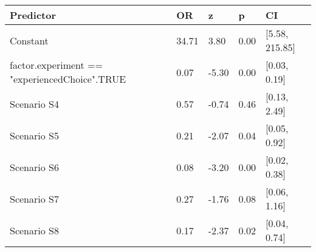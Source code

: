 \begin{tabular}{lllll}
  \toprule
Predictor & OR & z & p & CI \\ 
  \midrule
Constant & 34.71 & 3.80 & 0.00 & [5.58, 215.85] \\ 
  factor.experiment == "experiencedChoice".TRUE & 0.07 & -5.30 & 0.00 & [0.03, 0.19] \\ 
  Scenario S4 & 0.57 & -0.74 & 0.46 & [0.13, 2.49] \\ 
  Scenario S5 & 0.21 & -2.07 & 0.04 & [0.05, 0.92] \\ 
  Scenario S6 & 0.08 & -3.20 & 0.00 & [0.02, 0.38] \\ 
  Scenario S7 & 0.27 & -1.76 & 0.08 & [0.06, 1.16] \\ 
  Scenario S8 & 0.17 & -2.37 & 0.02 & [0.04, 0.74] \\ 
   \bottomrule
\end{tabular}
